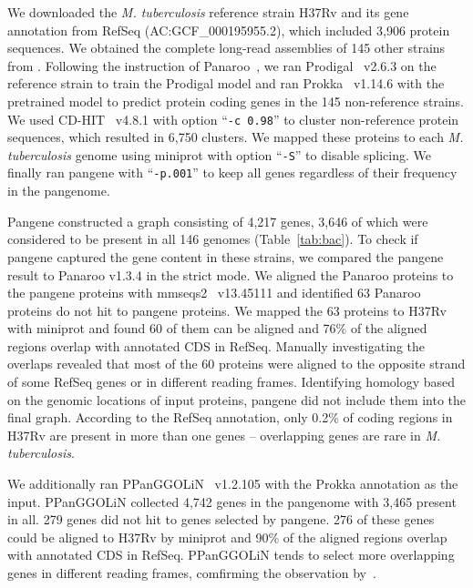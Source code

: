 \documentclass[webpdf,contemporary,large,namedate]{oup-authoring-template}%
\begin{document}
We downloaded the \emph{M. tuberculosis} reference strain H37Rv and its gene annotation from RefSeq (AC:GCF\_000195955.2),
which included 3,906 protein sequences.
We obtained the complete long-read assemblies of 145 other strains from \citet{Marin:2022aa}.
Following the instruction of Panaroo~\citep{Tonkin-Hill:2020aa},
we ran Prodigal~\citep{Hyatt:2010aa} v2.6.3 on the reference strain to train the Prodigal model
and ran Prokka~\citep{Seemann:2014aa} v1.14.6 with the pretrained model to predict protein coding genes
in the 145 non-reference strains.
We used CD-HIT~\citep{Li:2006aa,Fu:2012aa} v4.8.1 with option ``{\tt -c 0.98}'' to cluster non-reference protein sequences,
which resulted in 6,750 clusters.
We mapped these proteins to each \emph{M. tuberculosis} genome using miniprot with option ``{\tt -S}'' to disable splicing.
We finally ran pangene with ``{\tt -p.001}''
to keep all genes regardless of their frequency in the pangenome.

Pangene constructed a graph consisting of 4,217 genes,
3,646 of which were considered to be present in all 146 genomes (Table~\ref{tab:bac}).
To check if pangene captured the gene content in these strains,
we compared the pangene result to Panaroo v1.3.4 in the strict mode.
We aligned the Panaroo proteins to the pangene proteins with mmseqs2~\citep{Steinegger:2017aa} v13.45111
and identified 63 Panaroo proteins do not hit to pangene proteins.
We mapped the 63 proteins to H37Rv with miniprot
and found 60 of them can be aligned
and 76\% of the aligned regions overlap with annotated CDS in RefSeq.
Manually investigating the overlaps revealed that most of the 60 proteins
were aligned to the opposite strand of some RefSeq genes or in different reading frames.
Identifying homology based on the genomic locations of input proteins,
pangene did not include them into the final graph.
According to the RefSeq annotation,
only 0.2\% of coding regions in H37Rv are present in more than one genes --
overlapping genes are rare in \emph{M. tuberculosis}.

We additionally ran PPanGGOLiN~\citep{Gautreau:2020aa} v1.2.105 with the Prokka annotation as the input.
PPanGGOLiN collected 4,742 genes in the pangenome with 3,465 present in all.
279 genes did not hit to genes selected by pangene.
276 of these genes could be aligned to H37Rv by miniprot
and 90\% of the aligned regions overlap with annotated CDS in RefSeq.
PPanGGOLiN tends to select more overlapping genes in different reading frames,
comfirming the observation by~\citet{Tonkin-Hill:2020aa}.
\end{document}
